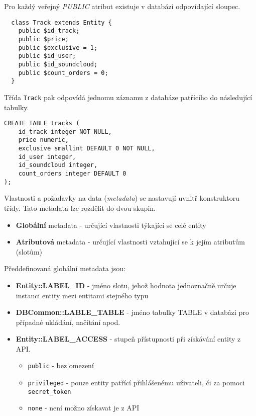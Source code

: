 \documentclass[12pt]{article}
\begin{document}
Pro každý veřejný \emph{PUBLIC} atribut existuje v databázi odpovídající sloupec.

\lstset{language=PHP}
\begin{lstlisting}
  class Track extends Entity {
    public $id_track;
    public $price;
    public $exclusive = 1;
    public $id_user;
    public $id_soundcloud;
    public $count_orders = 0;
  }
\end{lstlisting}

Třída \texttt{Track} pak odpovídá jednomu záznamu z databáze patřícího do následující tabulky.

\lstset{language=SQL}
\begin{lstlisting}
CREATE TABLE tracks (
    id_track integer NOT NULL,
    price numeric,
    exclusive smallint DEFAULT 0 NOT NULL,
    id_user integer,
    id_soundcloud integer,
    count_orders integer DEFAULT 0
);
\end{lstlisting}

Vlastnosti a požadavky na data (\emph{metadata}) se nastavují uvnitř konstruktoru třídy. Tato metadata lze rozdělit do dvou skupin.

\begin{itemize}
\item \textbf{Globální} metadata - určující vlastnosti týkající se celé entity
\item \textbf{Atributová} metadata - určující vlastnosti vztahující se k jejím atributům (slotům)
\end{itemize}

Předdefinovaná globální metadata jsou:

\begin{itemize}
\item \textbf{Entity::LABEL\_ID} - jméno slotu, jehož hodnota jednoznačně určuje instanci entity mezi entitami stejného typu
\item \textbf{DBCommon::LABLE\_TABLE} - jméno tabulky TABLE v databázi pro případné ukládání, načítání apod.
\item \textbf{Entity::LABEL\_ACCESS} - stupeň přístupnosti při získávání entity z API.
  \begin{itemize}
    \item{\texttt{public}} - bez omezení
    \item{\texttt{privileged}} - pouze entity patřící přihlášenému uživateli, či za pomoci \texttt{secret\_token}
    \item{\texttt{none}} - není možno získavat je z API
  \end{itemize}
\end{itemize}
\end{document}
